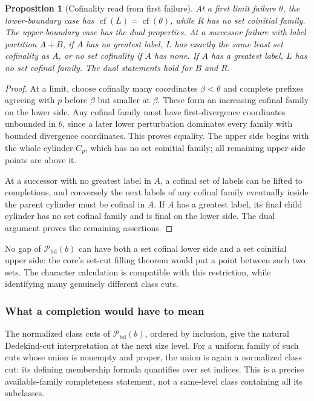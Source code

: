\documentclass[11pt]{article}
\newtheorem{proposition}[proposition]{Proposition}
\theoremstyle{definition}
\theoremstyle{remark}
\newcommand{\Pbd}{\mathcal P_{\mathrm{bd}}}
\newcommand{\cf}{\operatorname{cf}}
\begin{document}
\begin{proposition}[Cofinality read from first failure]\label{swo:cb:prop:cutcharacters}
At a first limit failure $\theta$, the lower-boundary case has
$\cf(L)=\cf(\theta)$, while $R$ has no set coinitial family.
The upper-boundary case has the dual properties.
At a successor failure with label partition $A+B$, if $A$ has no
greatest label, $L$ has exactly the same least set cofinality as $A$,
or no set cofinality if $A$ has none. If $A$ has a greatest label,
$L$ has no set cofinal family. The dual statements hold for $B$ and $R$.
\end{proposition}
\begin{proof}
At a limit, choose cofinally many coordinates $\beta<\theta$ and
complete prefixes agreeing with $p$ before $\beta$ but smaller at
$\beta$. These form an increasing cofinal family on the lower side.
Any cofinal family must have first-divergence coordinates unbounded
in $\theta$, since a later lower perturbation dominates every family
with bounded divergence coordinates. This proves equality. The upper
side begins with the whole cylinder $C_p$, which has no set coinitial
family; all remaining upper-side points are above it.

At a successor with no greatest label in $A$, a cofinal set of labels
can be lifted to completions, and conversely the next labels of any
cofinal family eventually inside the parent cylinder must be cofinal
in $A$. If $A$ has a greatest label, its final child cylinder has no
set cofinal family and is final on the lower side. The dual argument
proves the remaining assertions.
\end{proof}

No gap of $\Pbd(b)$ can have both a set cofinal lower side and a set coinitial
upper side: the core's set-cut filling theorem would put a point between
such two sets. The character calculation is compatible with this
restriction, while identifying many genuinely different class cuts.

\subsubsection{What a completion would have to mean}

The normalized class cuts of $\Pbd(b)$, ordered by inclusion, give the natural
Dedekind-cut interpretation at the next size level. For a uniform family
of such cuts whose union is nonempty and proper, the union is again a
normalized class cut: its defining membership formula quantifies over
set indices. This is a precise available-family completeness statement,
not a same-level class containing all its subclasses.
\end{document}
